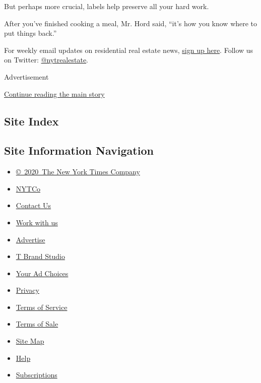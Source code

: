 But perhaps more crucial, labels help preserve all your hard work.

After you've finished cooking a meal, Mr. Hord said, ``it's how you know
where to put things back.''

For weekly email updates on residential real estate news,
\href{http://www.nytimes3xbfgragh.onion/newsletters/realestate/}{sign up
here}. Follow us on Twitter:
\href{https://twitter.com/nytrealestate}{@nytrealestate}.

Advertisement

\protect\hyperlink{after-bottom}{Continue reading the main story}

\hypertarget{site-index}{%
\subsection{Site Index}\label{site-index}}

\hypertarget{site-information-navigation}{%
\subsection{Site Information
Navigation}\label{site-information-navigation}}

\begin{itemize}
\tightlist
\item
  \href{https://help.nytimes3xbfgragh.onion/hc/en-us/articles/115014792127-Copyright-notice}{©~2020~The
  New York Times Company}
\end{itemize}

\begin{itemize}
\tightlist
\item
  \href{https://www.nytco.com/}{NYTCo}
\item
  \href{https://help.nytimes3xbfgragh.onion/hc/en-us/articles/115015385887-Contact-Us}{Contact
  Us}
\item
  \href{https://www.nytco.com/careers/}{Work with us}
\item
  \href{https://nytmediakit.com/}{Advertise}
\item
  \href{http://www.tbrandstudio.com/}{T Brand Studio}
\item
  \href{https://www.nytimes3xbfgragh.onion/privacy/cookie-policy\#how-do-i-manage-trackers}{Your
  Ad Choices}
\item
  \href{https://www.nytimes3xbfgragh.onion/privacy}{Privacy}
\item
  \href{https://help.nytimes3xbfgragh.onion/hc/en-us/articles/115014893428-Terms-of-service}{Terms
  of Service}
\item
  \href{https://help.nytimes3xbfgragh.onion/hc/en-us/articles/115014893968-Terms-of-sale}{Terms
  of Sale}
\item
  \href{https://spiderbites.nytimes3xbfgragh.onion}{Site Map}
\item
  \href{https://help.nytimes3xbfgragh.onion/hc/en-us}{Help}
\item
  \href{https://www.nytimes3xbfgragh.onion/subscription?campaignId=37WXW}{Subscriptions}
\end{itemize}
